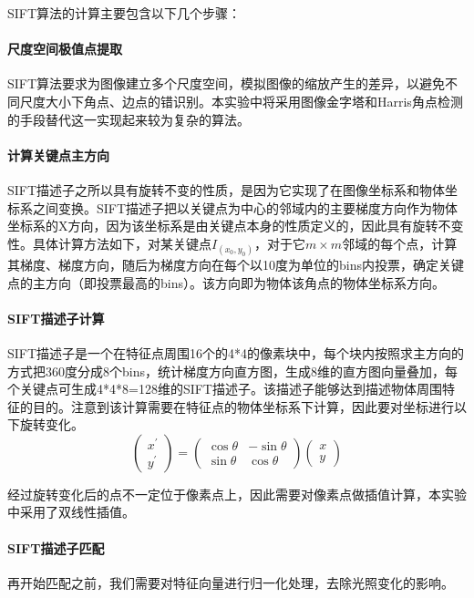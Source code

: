 \documentclass{article}
\begin{document}
SIFT算法的计算主要包含以下几个步骤：
\paragraph{尺度空间极值点提取} SIFT算法要求为图像建立多个尺度空间，模拟图像的缩放产生的差异，以避免不同尺度大小下角点、边点的错识别。本实验中将采用图像金字塔和Harris角点检测的手段替代这一实现起来较为复杂的算法。


\paragraph{计算关键点主方向} SIFT描述子之所以具有旋转不变的性质，是因为它实现了在图像坐标系和物体坐标系之间变换。SIFT描述子把以关键点为中心的邻域内的主要梯度方向作为物体坐标系的X方向，因为该坐标系是由关键点本身的性质定义的，因此具有旋转不变性。具体计算方法如下，对某关键点$I_{(x_0,y_0)}$，对于它$m\times m$邻域的每个点，计算其梯度、梯度方向，随后为梯度方向在每个以10度为单位的bins内投票，确定关键点的主方向（即投票最高的bins）。该方向即为物体该角点的物体坐标系方向。


\paragraph{SIFT描述子计算} SIFT描述子是一个在特征点周围16个的4*4的像素块中，每个块内按照求主方向的方式把360度分成8个bins，统计梯度方向直方图，生成8维的直方图向量叠加，每个关键点可生成4*4*8=128维的SIFT描述子。该描述子能够达到描述物体周围特征的目的。注意到该计算需要在特征点的物体坐标系下计算，因此要对坐标进行以下旋转变化。
$$\left(\begin{array}{l}{x^{\prime}} \\ {y^{\prime}}\end{array}\right)=\left(\begin{array}{cc}{\cos \theta} & {-\sin \theta} \\ {\sin \theta} & {\cos \theta}\end{array}\right)\left(\begin{array}{l}{x} \\ {y}\end{array}\right)$$

经过旋转变化后的点不一定位于像素点上，因此需要对像素点做插值计算，本实验中采用了双线性插值。

\paragraph{SIFT描述子匹配} 再开始匹配之前，我们需要对特征向量进行归一化处理，去除光照变化的影响。
\end{document}
